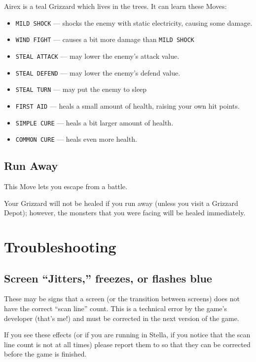 \documentclass[10pt,twocolumn,openany,article]{memoir}
\begin{document}
\begin{description}
Airex is a teal Grizzard which lives in the trees. It can learn these Moves:

\begin{itemize}
\item \texttt{MILD SHOCK} --- shocks  the enemy with static electricity,
  causing some damage.
\item \texttt{WIND FIGHT} --- causes a bit more damage than \texttt{MILD SHOCK}
\item \texttt{STEAL ATTACK} --- may lower the enemy's attack value.
\item \texttt{STEAL DEFEND} --- may lower the enemy's defend value.
\item \texttt{STEAL TURN} --- may put the enemy to sleep
\item \texttt{FIRST  AID} ---  heals a small  amount of  health, raising
  your own hit points.
\item \texttt{SIMPLE CURE} --- heals a bit larger amount of health.
\item \texttt{COMMON CURE} --- heals even more health.
\end{itemize}

\fi

\section{Run Away}

This Move lets you escape from a battle.

Your  Grizzard will  not be  healed if  you run  away (unless  you visit
a  Grizzard Depot);  however, the  monsters  that you  were facing  will
be healed immediately.



\chapter{Troubleshooting}

\ifdefined\DEMO

\section{Screen ``Jitters,'' freezes, or flashes blue}

These may  be signs that  a screen  (or the transition  between screens)
does not have the correct ``scan line'' count. This is a technical error
by the game's  developer (that's me!) and must be  corrected in the next
version of the game.

If you see these effects (or if you are running in Stella, if you notice
that the scan  line count is not \ifdefined{}   \fi at
all         times)         please         report         them         to
 so  that they
can be corrected before the game is finished.


\end{description}
\end{document}

